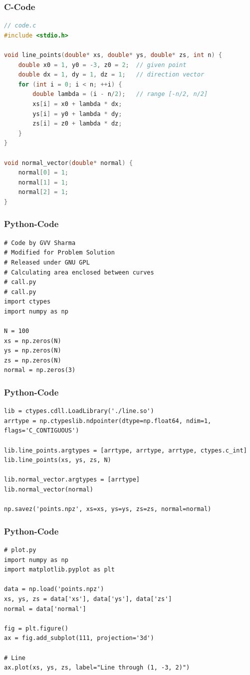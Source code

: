\documentclass{beamer}
\begin{document}
\begin{frame}[fragile]
\frametitle{C-Code}
\begin{lstlisting}[language=C]
// code.c
#include <stdio.h>

void line_points(double* xs, double* ys, double* zs, int n) {
    double x0 = 1, y0 = -3, z0 = 2;  // given point
    double dx = 1, dy = 1, dz = 1;   // direction vector
    for (int i = 0; i < n; ++i) {
        double lambda = (i - n/2);   // range [-n/2, n/2]
        xs[i] = x0 + lambda * dx;
        ys[i] = y0 + lambda * dy;
        zs[i] = z0 + lambda * dz;
    }
}

void normal_vector(double* normal) {
    normal[0] = 1;
    normal[1] = 1;
    normal[2] = 1;
}
\end{lstlisting}
\end{frame}
\begin{frame}[fragile]
\frametitle{Python-Code}
\begin{lstlisting}
# Code by GVV Sharma
# Modified for Problem Solution
# Released under GNU GPL
# Calculating area enclosed between curves
# call.py
# call.py
import ctypes
import numpy as np

N = 100
xs = np.zeros(N)
ys = np.zeros(N)
zs = np.zeros(N)
normal = np.zeros(3)
\end{lstlisting}
\end{frame}
\begin{frame}[fragile]
\frametitle{Python-Code}
\begin{lstlisting}
lib = ctypes.cdll.LoadLibrary('./line.so')
arrtype = np.ctypeslib.ndpointer(dtype=np.float64, ndim=1, flags='C_CONTIGUOUS')

lib.line_points.argtypes = [arrtype, arrtype, arrtype, ctypes.c_int]
lib.line_points(xs, ys, zs, N)

lib.normal_vector.argtypes = [arrtype]
lib.normal_vector(normal)

np.savez('points.npz', xs=xs, ys=ys, zs=zs, normal=normal)
\end{lstlisting}
\end{frame}
\begin{frame}[fragile]
\frametitle{Python-Code}
\begin{lstlisting}
# plot.py
import numpy as np
import matplotlib.pyplot as plt

data = np.load('points.npz')
xs, ys, zs = data['xs'], data['ys'], data['zs']
normal = data['normal']

fig = plt.figure()
ax = fig.add_subplot(111, projection='3d')

# Line
ax.plot(xs, ys, zs, label="Line through (1, -3, 2)")
\end{lstlisting}
\end{frame}
\end{document}
